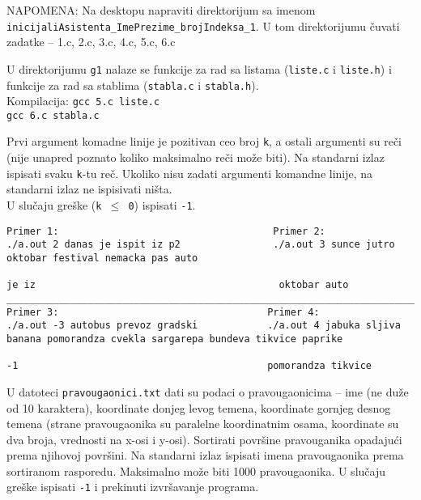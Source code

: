 NAPOMENA: Na desktopu napraviti direktorijum sa imenom \verb|inicijaliAsistenta_ImePrezime_brojIndeksa_1|.
U tom direktorijumu \v cuvati zadatke -- 1.c, 2.c, 3.c, 4.c, 5.c, 6.c

\bigskip

U direktorijumu {\tt g1} nalaze se funkcije za rad sa listama ({\tt liste.c} i {\tt liste.h}) i
funkcije za rad sa stablima ({\tt stabla.c} i {\tt stabla.h}).  \\
Kompilacija: {\tt gcc 5.c liste.c} \\
             {\tt gcc 6.c stabla.c}

\bigskip

\begin{z}
Prvi argument komadne linije je pozitivan ceo broj {\tt k}, a ostali argumenti
su re\v ci (nije unapred poznato koliko maksimalno re\v ci mo\v ze biti).
Na standarni izlaz ispisati svaku {\tt k}-tu re\v c.
Ukoliko nisu zadati argumenti komandne linije, na standarni izlaz ne ispisivati ni\v sta. \\
U slu\v caju gre\v ske ({\tt k $\le$ 0}) ispisati {\tt -1}.
\end{z}

\begin{verbatim}
Primer 1:                                     Primer 2:
./a.out 2 danas je ispit iz p2                ./a.out 3 sunce jutro oktobar festival nemacka pas auto

je iz                                          oktobar auto
_______________________________________________________________________________________________________________
Primer 3:                                    Primer 4:
./a.out -3 autobus prevoz gradski            ./a.out 4 jabuka sljiva banana pomorandza cvekla sargarepa bundeva tikvice paprike

-1                                           pomorandza tikvice
\end{verbatim}

\begin{z}
U datoteci {\tt pravougaonici.txt} dati su podaci o pravougaonicima -- ime (ne du\v ze od 10 karaktera), koordinate
donjeg levog temena, koordinate gornjeg desnog temena (strane pravougaonika su paralelne koordinatnim osama, koordinate su dva broja,
vrednosti na x-osi i y-osi). Sortirati povr\v sine pravouganika opadaju\'ci prema njihovoj povr\v sini.
Na standarni izlaz ispisati imena pravougaonika prema sortiranom rasporedu.
Maksimalno mo\v ze biti 1000 pravougaonika. U slu\v caju gre\v ske ispisati {\tt -1} i prekinuti izvr\v savanje programa.
\end{z}
\begin{verbatim}

\end{verbatim}


